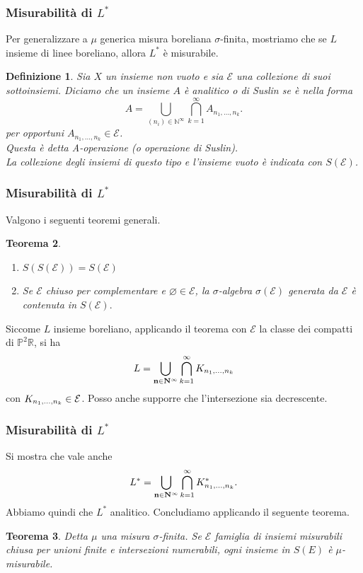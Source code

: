 \documentclass[11pt]{beamer} %
\newcommand{\R}{\mathbb{R}}
\renewcommand{\P}{\mathbb{P}}
\newcommand{\E}{\mathcal{E}}
\newcommand{\<}{\langle}
\renewcommand{\>}{\rangle}
\theoremstyle{theorem}
\newtheorem{teo}{Teorema}
\theoremstyle{theorem}
\theoremstyle{theorem}
\theoremstyle{theorem}
\newtheorem{defin}[teo]{Definizione}
\theoremstyle{theorem}
\begin{document}
\begin{frame}
	\frametitle{Misurabilità di $L^*$}
	Per generalizzare a $\mu$ generica misura boreliana $\sigma$-finita, mostriamo che se $L$ insieme di linee boreliano, allora $L^*$ è misurabile. \pause

\begin{defin}
	Sia $X$ un insieme non vuoto e sia $\mathcal{E}$ una collezione di suoi sottoinsiemi. \pause Diciamo che un insieme $A$ è analitico o di Suslin se è nella forma
	$$
	A=\bigcup_{\left(n_{i}\right) \in \mathbb{N}^{\infty}} \bigcap_{k=1}^{\infty} A_{n_{1}, \ldots, n_{k}} .
	$$
	per opportuni $A_{n_{1}, \ldots, n_{k}} \in \E$.\\ \pause
	Questa è detta A-operazione (o operazione di Suslin).\\
	La collezione degli insiemi di questo tipo e l'insieme vuoto è indicata con $S(\mathcal{E})$.
\end{defin}	

\end{frame}

\begin{frame}[fragile]
\frametitle{Misurabilità di $L^*$}	
Valgono i seguenti teoremi generali. \pause

\begin{teo}
	\begin{enumerate}[i]
		\item $S(S(\mathcal{E}))=S(\mathcal{E})$\\ \pause
		\item Se $\E$ chiuso per complementare e $\varnothing \in \E$, la $\sigma$-algebra $\sigma(\mathcal{E})$ generata da $\mathcal{E}$ è contenuta in $S(\mathcal{E}).$
	\end{enumerate}
\end{teo}
\pause
Siccome $L$ insieme boreliano, applicando il teorema con $\E$ la classe dei compatti di $\P^2 \R$, si ha
$$L=\bigcup_{{\bf n}\in{\bf N}^\infty}\bigcap_{k=1}^\infty K_{n_1,\ldots,n_k}$$
con $K_{n_1,\ldots,n_k}\in {\cal E}$. Posso anche supporre che l'intersezione sia decrescente.

\end{frame}

\begin{frame}
\frametitle{Misurabilità di $L^*$}	
Si mostra che vale anche
$$L^*=\bigcup_{{\bf n}\in{\bf N}^\infty}\bigcap_{k=1}^\infty K_{n_1,\ldots,n_k}^*.$$ 
\pause
Abbiamo quindi che $L^*$ analitico. Concludiamo applicando il seguente teorema. \\
\pause
\begin{teo}
 	Detta $\mu$ una misura $\sigma$-finita. Se $\E$ famiglia di insiemi misurabili chiusa per unioni finite e intersezioni numerabili, ogni insieme in $S(E)$ è $\mu$-misurabile.
\end{teo}	
	
	
\end{frame}
\end{document}
